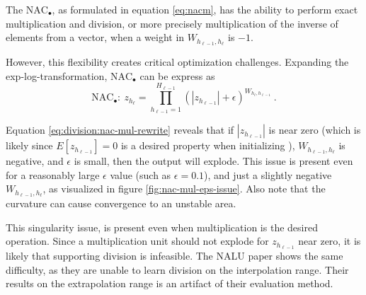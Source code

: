 The $\text{NAC}_{\bullet}$, as formulated in equation \ref{eq:nacm}, has the ability to perform exact multiplication and division, or more precisely multiplication of the inverse of elements from a vector, when a weight in $W_{h_{\ell-1},h_\ell}$ is $-1$.

However, this flexibility creates critical optimization challenges. Expanding the exp-log-transformation, $\text{NAC}_{\bullet}$ can be express as
\begin{equation}
\textrm{NAC}_\bullet:\ z_{h_\ell} = \prod_{h_{\ell-1}=1}^{H_{\ell-1}} (|z_{h_{\ell-1}}| + \epsilon)^{W_{h_{\ell}, h_{\ell-1}}}\ .
\label{eq:division:nac-mul-rewrite}
\end{equation}

Equation \eqref{eq:division:nac-mul-rewrite} reveals that if $|z_{h_{\ell-1}}|$ is near zero (which is likely since $E[z_{h_{\ell-1}}] = 0$ is a desired property when initializing \cite{glorot-initialization}), $W_{h_{\ell-1},h_\ell}$ is negative, and $\epsilon$ is small, then the output will explode. This issue is present even for a reasonably large $\epsilon$ value (such as $\epsilon = 0.1$), and just a slightly negative $W_{h_{\ell-1},h_\ell}$, as visualized in figure \ref{fig:nac-mul-eps-issue}. Also note that the curvature can cause convergence to an unstable area.

This singularity issue, is present even when multiplication is the desired operation. Since a multiplication unit should not explode for $z_{h_{\ell-1}}$ near zero, it is likely that  supporting division is infeasible. The NALU paper shows the same difficulty, as they are unable to learn division on the interpolation range. Their results on the extrapolation range is an artifact of their evaluation method.


